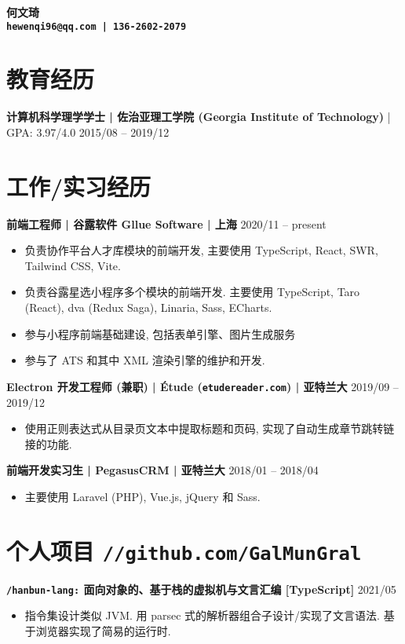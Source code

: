 \documentclass[10 pt]{article}
\begin{document}
\begin{center}
\textbf{\huge 何文琦}\\
\vspace{0.2em}
\textbf{\texttt{hewenqi96@qq.com | 136-2602-2079 }}
\end{center}

\section*{教育经历}
\textbf{计算机科学理学学士 | 佐治亚理工学院 (Georgia Institute of Technology)} | GPA: 3.97/4.0 \hfill 2015/08 -- 2019/12

\section*{工作/实习经历}
\textbf{前端工程师 | 谷露软件 Gllue Software | 上海} \hfill 2020/11 -- present
\begin{itemize}
\item 负责协作平台人才库模块的前端开发, 主要使用 TypeScript, React, SWR, Tailwind CSS, Vite.
\item 负责谷露星选小程序多个模块的前端开发. 主要使用 TypeScript, Taro (React), dva (Redux Saga), Linaria, Sass, ECharts.
\item 参与小程序前端基础建设, 包括表单引擎、图片生成服务
\item 参与了 ATS 和其中 XML 渲染引擎的维护和开发.
\end{itemize}

\textbf{Electron 开发工程师 (兼职) | Étude (\texttt{etudereader.com}) | 亚特兰大} \hfill 2019/09 -- 2019/12
\begin{itemize}
\item 使用正则表达式从目录页文本中提取标题和页码, 实现了自动生成章节跳转链接的功能.
\end{itemize}

\textbf{前端开发实习生 | PegasusCRM | 亚特兰大} \hfill 2018/01 -- 2018/04
\begin{itemize}
\item 主要使用 Laravel (PHP), Vue.js, jQuery 和 Sass.
\end{itemize} 

\section*{个人项目 \texttt{\large //github.com/GalMunGral}}


\textbf{\texttt{/hanbun-lang:} 面向对象的、基于栈的虚拟机与文言汇编 [TypeScript]} \hfill 2021/05
\begin{itemize}
\item 指令集设计类似 JVM. 用 parsec 式的解析器组合子设计/实现了文言语法. 基于浏览器实现了简易的运行时.
\end{itemize}
\end{document}

